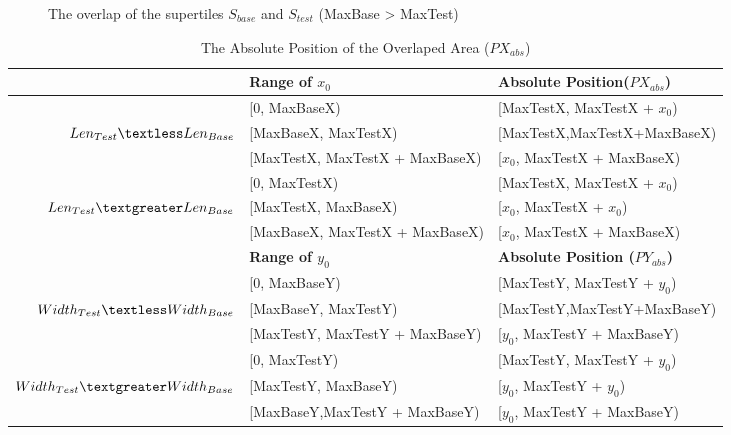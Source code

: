 \documentclass[preprint,natbib,10pt]{article}
\begin{document}
\begin{enumerate}
\begin{enumerate}
\begin{figure}

  \caption{The overlap of the supertiles $S_{base}$ and $S_{test}$ (MaxBase > MaxTest)} \label{fig:overlapsupertilegt}
\end{figure}

\begin{table}\caption{The Absolute Position of the Overlaped Area ($PX_{abs}$)}
 \begin{tabular}{|r|l|l|}
 \hline
&{\bf Range of $x_0$}  &{\bf Absolute Position($PX_{abs}$)}\\
 \hline
                                 &[0, MaxBaseX)&[MaxTestX, MaxTestX + $x_0$)\\
 $Len_{Test} \textless Len_{Base}$&[MaxBaseX, MaxTestX)&[MaxTestX,MaxTestX+MaxBaseX)\\
                                 &[MaxTestX, MaxTestX + MaxBaseX)&[$x_0$, MaxTestX + MaxBaseX)\\
 \hline
                                     &[0, MaxTestX)&[MaxTestX, MaxTestX + $x_0$)\\
 $Len_{Test} \textgreater Len_{Base}$&[MaxTestX, MaxBaseX)&[$x_0$, MaxTestX + $x_0$)\\
                                     &[MaxBaseX, MaxTestX + MaxBaseX)&[$x_0$, MaxTestX + MaxBaseX)\\
 \hline
 \hline
                                     &{\bf Range of $y_0$}&{\bf Absolute Position ($PY_{abs}$)}\\
 \hline
                                     &[0, MaxBaseY)&[MaxTestY, MaxTestY + $y_0$)\\
$Width_{Test} \textless Width_{Base}$&[MaxBaseY, MaxTestY)&[MaxTestY,MaxTestY+MaxBaseY)\\
                                       &[MaxTestY, MaxTestY + MaxBaseY)&[$y_0$, MaxTestY + MaxBaseY)\\
 \hline
                                        &[0, MaxTestY)&[MaxTestY, MaxTestY + $y_0$)\\
$Width_{Test} \textgreater Width_{Base}$&[MaxTestY, MaxBaseY)&[$y_0$, MaxTestY + $y_0$)\\
                                        &[MaxBaseY,MaxTestY + MaxBaseY)&[$y_0$, MaxTestY + MaxBaseY)\\
 \hline
\end{tabular}
\end{table}


\end{enumerate}
\end{enumerate}
\end{document}
